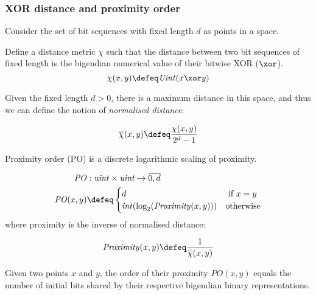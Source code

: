 \subsubsection{XOR distance and proximity order\statusgreen}\label{sec:proximity}
Consider the set of bit sequences with fixed length $d$ as points in a space. 

\begin{definition}\label{def:xor}
Define a distance metric $\chi$ such that
the distance between two bit sequences of fixed length is the bigendian numerical value of their bitwise XOR ($\xor$).
\begin{equation}
\chi(x, y) \defeq \mathit{Uint}(x  \xor y)
\end{equation}

Given the fixed length $d>0$, there is a maximum distance in this space, and thus we can define the notion of \emph{normalised distance}:

\begin{equation}
\overline{\chi}(x, y) \defeq \frac{\chi(x,y)}{2^d-1}
\end{equation}
\end{definition}



\begin{definition}
\label{def:xorPO}
Proximity order (PO) is a discrete logarithmic scaling of proximity.

\begin{equation}
\begin{split}
\mathit{PO}&: \mathit{uint} \times\mathit{uint}\mapsto \overline{0,d}\\
\mathit{PO}(x,y) &\defeq 
\begin{cases}
d & \text{ if } x=y\\
\mathit{int}(\log_2(\mathit{Proximity}(x, y)))&\text{otherwise}\\
\end{cases}
\end{split}
\end{equation}
where proximity is the inverse of normalised distance:

\begin{equation}
\mathit{Proximity}(x, y) \defeq \frac{1}{\overline{\chi}(x,y)}
\end{equation}{}

Given two points $x$ and $y$,  the order of their proximity $\mathit{PO}(x,y)$ equals the number of initial bits shared by their respective bigendian binary representations.
\end{definition}




